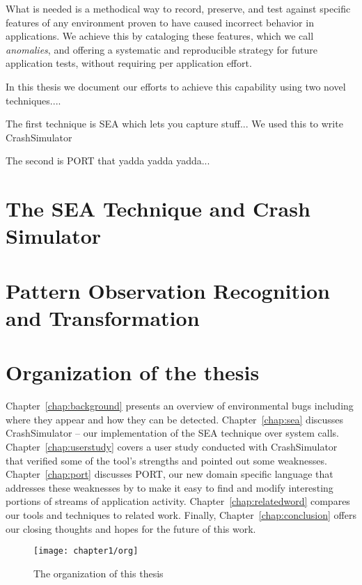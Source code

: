 What is needed is a methodical way to record, preserve, and test against
specific features of any environment proven to have caused incorrect
behavior in applications. We achieve this by cataloging these
features, which we call \textit{anomalies}, and
offering a systematic and reproducible strategy for
future application tests, without
requiring per application effort.

In this thesis we document our efforts to achieve this capability using two
novel techniques....

The first technique is SEA which lets you capture stuff...
We used this to write CrashSimulator

The second is PORT that yadda yadda yadda...

\section{The SEA Technique and Crash Simulator}

\section{Pattern Observation Recognition and Transformation}


\section{Organization of the thesis}
\label{sec:organization}
Chapter~\ref{chap:background}
presents an overview of environmental bugs including where they
appear and how they can be detected.
Chapter~\ref{chap:sea}
discusses CrashSimulator -- our implementation of the SEA
technique over system calls.
Chapter~\ref{chap:userstudy}
covers a user study conducted with CrashSimulator that
verified some of the tool's strengths and pointed out some weaknesses.
Chapter~\ref{chap:port}
discusses PORT,
our new domain specific language that addresses these weaknesses by to make
it easy to find and modify interesting portions of streams of
application activity.
Chapter~\ref{chap:relatedword}
compares our tools and techniques to related work.
Finally,
Chapter~\ref{chap:conclusion} offers our closing thoughts and hopes for
the future of this work.


\begin{figure}
  \centering
  \texttt{[image: chapter1/org]}
  \caption{The organization of this thesis}
  \label{fig:organization-1}
\end{figure}
